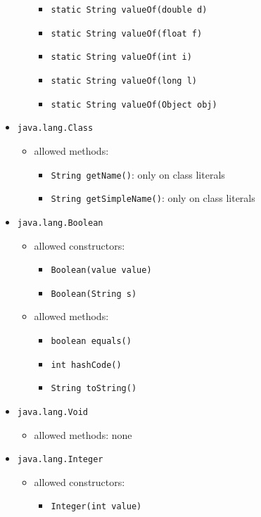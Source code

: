 \documentclass[a4paper]{report}
\begin{document}
\begin{itemize}
\begin{itemize}
\begin{itemize}
				\item \texttt{static String valueOf(double d)}
				\item \texttt{static String valueOf(float f)}
				\item \texttt{static String valueOf(int i)}
				\item \texttt{static String valueOf(long l)}
				\item \texttt{static String valueOf(Object obj)}
			\end{itemize}
	\end{itemize}
\item \texttt{java.lang.Class}
	\begin{itemize}
	\item allowed methods: 
			\begin{itemize}
				\item \texttt{String getName()}: only on class literals
				\item \texttt{String getSimpleName()}: only on class literals
			\end{itemize}
	\end{itemize}
\item \texttt{java.lang.Boolean}
	\begin{itemize}
	\item allowed constructors:
			\begin{itemize}
				\item \texttt{Boolean(value value)}
				\item \texttt{Boolean(String s)}
			\end{itemize}
	\item allowed methods:
			\begin{itemize}
				\item \texttt{boolean equals()}
				\item \texttt{int hashCode()}
				\item \texttt{String toString()}
			\end{itemize}
	\end{itemize}
\item \texttt{java.lang.Void}
	\begin{itemize}
	\item allowed methods: none
	\end{itemize}
\item \texttt{java.lang.Integer}
	\begin{itemize}
	\item allowed constructors:
			\begin{itemize}
				\item \texttt{Integer(int value)}

\end{itemize}
\end{itemize}
\end{itemize}
\end{document}
